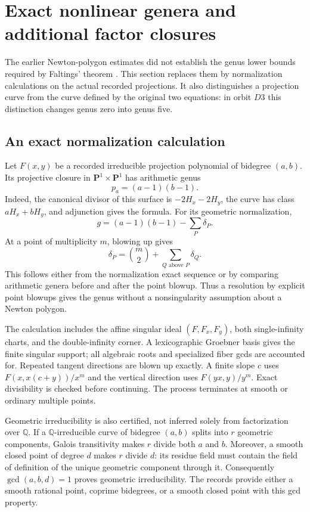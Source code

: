 \documentclass[11pt,letterpaper]{article}
\theoremstyle{definition}\newtheorem{definition}[theorem]{Definition}
\theoremstyle{remark}\newtheorem{remark}[theorem]{Remark}
\newcommand{\Q}{\mathbb Q}\newcommand{\Z}{\mathbb Z}\newcommand{\R}{\mathbb R}
\begin{document}
\section{Exact nonlinear genera and additional factor closures}\label{sec:newgeometry}
The earlier Newton-polygon estimates did not establish the genus lower bounds required by Faltings' theorem \cite{Faltings}. This section replaces them by normalization calculations on the actual recorded projections. It also distinguishes a projection curve from the curve defined by the original two equations: in orbit $D3$ this distinction changes genus zero into genus five.

\subsection{An exact normalization calculation}
Let $F(x,y)$ be a recorded irreducible projection polynomial of bidegree $(a,b)$. Its projective closure in $\mathbf P^1\times\mathbf P^1$ has arithmetic genus
\[
p_a=(a-1)(b-1).
\]
Indeed, the canonical divisor of this surface is $-2H_x-2H_y$, the curve has class $aH_x+bH_y$, and adjunction gives the formula. For its geometric normalization,
\begin{equation}\label{eq:delta-genus}
g=(a-1)(b-1)-\sum_P\delta_P.
\end{equation}
At a point of multiplicity $m$, blowing up gives
\[
\delta_P=\binom m2+\sum_{Q\text{ above }P}\delta_Q.
\]
This follows either from the normalization exact sequence or by comparing arithmetic genera before and after the point blowup. Thus a resolution by explicit point blowups gives the genus without a nonsingularity assumption about a Newton polygon.

The calculation includes the affine singular ideal $(F,F_x,F_y)$, both single-infinity charts, and the double-infinity corner. A lexicographic Groebner basis gives the finite singular support; all algebraic roots and specialized fiber gcds are accounted for. Repeated tangent directions are blown up exactly. A finite slope $c$ uses $F(x,x(c+y))/x^m$ and the vertical direction uses $F(yx,y)/y^m$. Exact divisibility is checked before continuing. The process terminates at smooth or ordinary multiple points.

Geometric irreducibility is also certified, not inferred solely from factorization over $\Q$. If a $\Q$-irreducible curve of bidegree $(a,b)$ splits into $r$ geometric components, Galois transitivity makes $r$ divide both $a$ and $b$. Moreover, a smooth closed point of degree $d$ makes $r$ divide $d$: its residue field must contain the field of definition of the unique geometric component through it. Consequently $\gcd(a,b,d)=1$ proves geometric irreducibility. The records provide either a smooth rational point, coprime bidegrees, or a smooth closed point with this gcd property.
\end{document}
